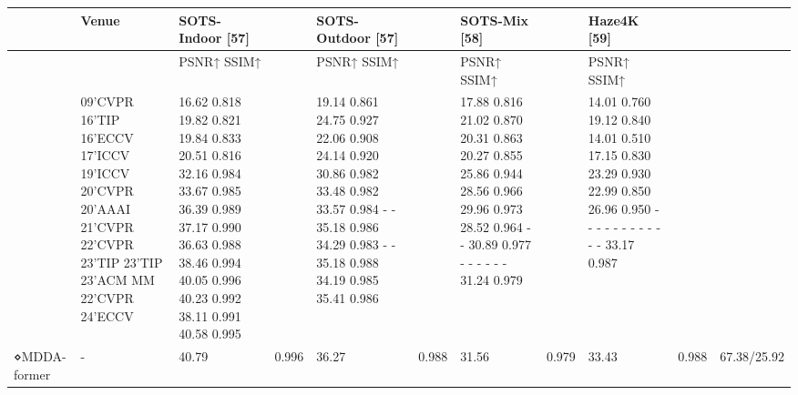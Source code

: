 \begin{tabular}{lllllllllll}
\toprule
 & Venue & SOTS-Indoor [57] &  & SOTS-Outdoor [57] &  & SOTS-Mix [58] &  & Haze4K [59] &  &  \\
\midrule
 &  & PSNR↑ SSIM↑ &  & PSNR↑ SSIM↑ &  & PSNR↑ SSIM↑ &  & PSNR↑ SSIM↑ &  &  \\
 & 09’CVPR 16’TIP 16’ECCV 17’ICCV 19’ICCV 20’CVPR 20’AAAI 21’CVPR 22’CVPR 23’TIP 23’TIP 23’ACM MM 22’CVPR 24’ECCV & 16.62 0.818 19.82 0.821 19.84 0.833 20.51 0.816 32.16 0.984 33.67 0.985 36.39 0.989 37.17 0.990 36.63 0.988 38.46 0.994 40.05 0.996 40.23 0.992 38.11 0.991 40.58 0.995 &  & 19.14 0.861 24.75 0.927 22.06 0.908 24.14 0.920 30.86 0.982 33.48 0.982 33.57 0.984 - - 35.18 0.986 34.29 0.983 - - 35.18 0.988 34.19 0.985 35.41 0.986 &  & 17.88 0.816 21.02 0.870 20.31 0.863 20.27 0.855 25.86 0.944 28.56 0.966 29.96 0.973 28.52 0.964 - - 30.89 0.977 - - - - - - 31.24 0.979 &  & 14.01 0.760 19.12 0.840 14.01 0.510 17.15 0.830 23.29 0.930 22.99 0.850 26.96 0.950 - - - - - - - - - - - - 33.17 0.987 &  &  \\
⋄MDDA-former & - & 40.79 & 0.996 & 36.27 & 0.988 & 31.56 & 0.979 & 33.43 & 0.988 & 67.38/25.92 \\
\bottomrule
\end{tabular}
